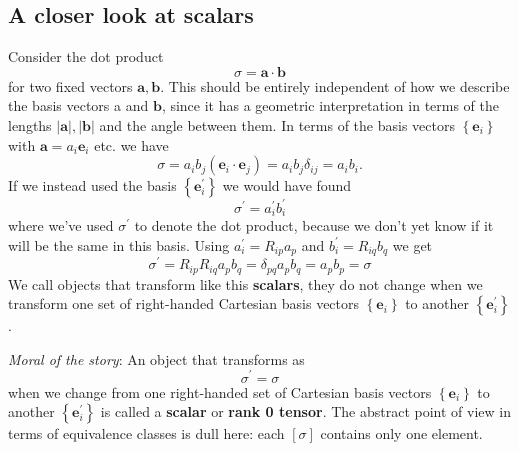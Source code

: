 \subsection{A closer look at scalars}
Consider the dot product
\[
    \sigma=\mathbf{a} \cdot \mathbf{b}
\]
for two fixed vectors $\mathbf{a}, \mathbf{b}$. This should be entirely independent of how we describe the basis vectors a and $\mathbf{b}$, since it has a geometric interpretation in terms of the lengths $|\mathbf{a}|,|\mathbf{b}|$ and the angle between them. In terms of the basis vectors $\left\{\mathbf{e}_{i}\right\}$ with $\mathbf{a}=a_{i} \mathbf{e}_{i}$ etc. we have
\[
\sigma=a_{i} b_{j}\left(\mathbf{e}_{i} \cdot \mathbf{e}_{j}\right)=a_{i} b_{j} \delta_{i j}=a_{i} b_{i}.
\]
If we instead used the basis $\left\{\mathbf{e}_{i}^{\prime}\right\}$ we would have found
\[
\sigma^{\prime}=a_{i}^{\prime} b_{i}^{\prime}
\]
where we've used $\sigma^{\prime}$ to denote the dot product, because we don't yet know if it will be the same in this basis. Using $a_{i}^{\prime}=R_{i p} a_{p}$ and $b_{i}^{\prime}=R_{i q} b_{q}$ we get
\[
\sigma^{\prime}=R_{i p} R_{i q} a_{p} b_{q}=\delta_{p q} a_{p} b_{q}=a_{p} b_{p}=\sigma
\]
We call objects that transform like this \textbf{scalars}, they do not change when we transform one set of right-handed Cartesian basis vectors $\left\{\mathbf{e}_{i}\right\}$ to another $\left\{\mathbf{e}_{i}^{\prime}\right\}$. 

\textit{Moral of the story}: An object that transforms as
\[
    \boxed{\sigma^{\prime}=\sigma}
\]
when we change from one right-handed set of Cartesian basis vectors $\left\{\mathbf{e}_{i}\right\}$ to another $\left\{\mathbf{e}_{i}^{\prime}\right\}$ is called a \textbf{scalar} or \textbf{rank 0 tensor}. The abstract point of view in terms of equivalence classes is dull here: each $[\sigma]$ contains only one element.

